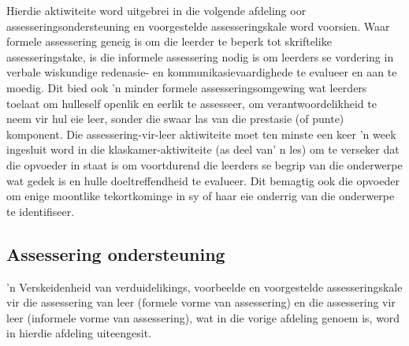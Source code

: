 Hierdie aktiwiteite word uitgebrei in die volgende afdeling oor assesseringsondersteuning en voorgestelde assesseringskale word voorsien. Waar formele assessering geneig is om die leerder te beperk tot skriftelike assesseringstake, is die informele assessering nodig is om leerders se vordering in verbale wiskundige redenasie- en kommunikasievaardighede te evalueer en aan te moedig. Dit bied ook 'n minder formele assesseringsomgewing wat leerders toelaat om hulleself openlik en eerlik te assesseer, om verantwoordelikheid te neem vir hul eie leer, sonder die swaar las van die prestasie (of punte) komponent. Die assessering-vir-leer aktiwiteite moet ten minste een keer 'n week ingesluit word in die klaskamer-aktiwiteite (as deel van' n les) om te verseker dat die opvoeder in staat is om voortdurend die leerders se begrip van die onderwerpe wat gedek is en hulle doeltreffendheid te evalueer.  Dit bemagtig ook die opvoeder om enige moontlike tekortkominge in sy of haar eie onderrig van die onderwerpe te identifiseer.

\subsection{Assessering ondersteuning}
'n Verskeidenheid van verduidelikings, voorbeelde en voorgestelde assesseringskale vir die assessering van leer (formele vorme van assessering) en die assessering vir leer (informele vorme van assessering), wat in die vorige afdeling genoem is, word in hierdie afdeling uiteengesit.

